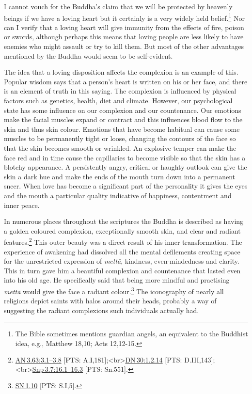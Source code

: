 \documentclass[10pt, openright]{book}
\begin{document}
I cannot vouch for the Buddha’s claim that we will be protected by heavenly beings if we have a loving heart but it certainly is a very widely held belief.\footnote {The Bible sometimes mentions guardian angels, an equivalent to the Buddhist idea, e.g., Matthew 18,10; Acts 12,12-15.} Nor can I verify that a loving heart will give immunity from the effects of fire, poison or swords, although perhaps this means that loving people are less likely to have enemies who might assault or try to kill them. But most of the other advantages mentioned by the Buddha would seem to be self-evident.


The idea that a loving disposition affects the complexion is an example of this. Popular wisdom says that a person’s heart is written on his or her face, and there is an element of truth in this saying. The complexion is influenced by physical factors such as genetics, health, diet and climate. However, our psychological state has some influence on our complexion and our countenance. Our emotions make the facial muscles expand or contract and this influences blood flow to the skin and thus skin colour. Emotions that have become habitual can cause some muscles to be permanently tight or loose, changing the contours of the face so that the skin becomes smooth or wrinkled. An explosive temper can make the face red and in time cause the capillaries to become visible so that the skin has a blotchy appearance. A persistently angry, critical or haughty outlook can give the skin a dark hue and make the ends of the mouth turn down into a permanent sneer. When love has become a significant part of the personality it gives the eyes and the mouth a particular quality indicative of happiness, contentment and inner peace.


In numerous places throughout the scriptures the Buddha is described as having a golden coloured complexion, exceptionally smooth skin, and clear and radiant features.\footnote {\href{https://suttacentral.net/an3.63/en/sujato\#3.1}{AN 3.63:3.1–3.8} [PTS: A.I,181];<br>\href{https://suttacentral.net/dn30/en/sujato\#1.2.14}{DN 30:1.2.14} [PTS: D.III,143];<br>\href{https://suttacentral.net/snp3.7/en/sujato\#16.1}{Snp 3.7:16.1–16.3} [PTS: Sn.551].} This outer beauty was a direct result of his inner transformation. The experience of awakening had dissolved all the mental defilements creating space for the unrestricted expression of \textit{mettā}, kindness, even-mindedness and clarity. This in turn gave him a beautiful complexion and countenance that lasted even into his old age. He specifically said that being more mindful and practising \textit{mettā} would give the face a radiant colour.\footnote {\href{https://suttacentral.net/sn1.10/en/sujato}{SN 1.10} [PTS: S.I,5].} The iconography of nearly all religions depict saints with halos around their heads, probably a way of suggesting the radiant complexions such individuals actually had.
\end{document}
